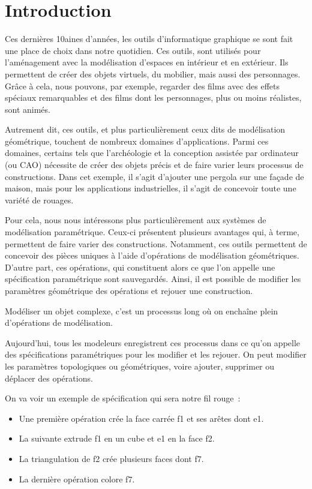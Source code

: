 \documentclass[a4paper]{article}
\title{}
\author{}
\date{}
\begin{document}
\section{Introduction}


Ces dernières 10aines d'années, les outils d'informatique graphique se sont fait
une place de choix dans notre quotidien. %
Ces outils, sont utilisés pour l'aménagement avec la modélisation d'espaces en
intérieur et en extérieur. Ils permettent de créer des objets virtuels, du
mobilier, mais aussi des personnages. %
Grâce à cela, nous pouvons, par exemple, regarder des films avec des effets
spéciaux remarquables et des films dont les personnages, plus ou moins
réalistes, sont animés. %


Autrement dit, ces outils, et plus particulièrement ceux dits de modélisation
géométrique, touchent de nombreux domaines d'applications. %
Parmi ces domaines, certains tels que l'archéologie et la conception assistée
par ordinateur (ou CAO) nécessite de créer des objets précis et de faire varier
leurs processus de constructions. %
Dans cet exemple, il s'agit d'ajouter une pergola sur une façade de maison, mais
pour les applications industrielles, il s'agit de concevoir toute une variété
de rouages.  %

Pour cela, nous nous intéressons plus particulièrement aux systèmes de
modélisation paramétrique. %
Ceux-ci présentent plusieurs avantages qui, à terme, permettent de faire varier
des constructions. %
Notamment, ces outils permettent de concevoir des pièces uniques à l'aide
d'opérations de modélisation géométriques. %
D'autre part, ces opérations, qui constituent alors ce que l'on appelle une
spécification paramétrique sont sauvegardés. %
Ainsi, il est possible de modifier les paramètres géométrique des opérations et
rejouer une construction. %


Modéliser un objet complexe, c'est un processus long où on enchaîne
plein d'opérations de modélisation.

Aujourd'hui, tous les modeleurs enregistrent ces processus dans ce qu'on appelle
des spécifications paramétriques pour les modifier et les rejouer. On peut
modifier les paramètres topologiques ou géométriques, voire ajouter, supprimer
ou déplacer des opérations.

On va voir un exemple de spécification qui sera notre fil rouge~:
\begin{itemize}
	\item Une première opération crée la face carrée f1 et ses arêtes dont e1.
	\item La suivante extrude f1 en un cube et e1 en la face f2.
	\item La triangulation de f2 crée plusieurs faces dont f7.
	\item La dernière opération colore f7.
\end{itemize}
\end{document}
